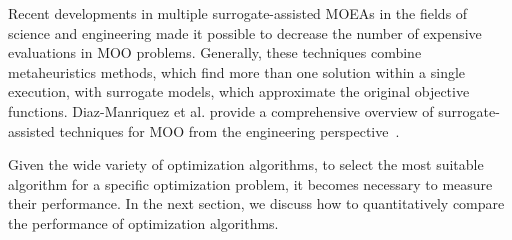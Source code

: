 	
	Recent developments in multiple surrogate-assisted \acp{MOEA} in the fields of science and engineering \cite{Hussein2016,Zapotecas-Martinez2016} made it possible to decrease the number of expensive evaluations in \ac{MOO} problems. Generally, these techniques combine metaheuristics methods, which find more than one solution within a single execution, with surrogate models, which approximate the original objective functions. Diaz-Manriquez et al. provide a comprehensive overview of surrogate-assisted techniques for \ac{MOO} from the engineering perspective~\cite{Diaz-Manriquez2016}. 
	
	Given the wide variety of optimization algorithms, to select the most suitable algorithm for a specific optimization problem, it becomes necessary to measure their performance. In the next section, we discuss how to quantitatively compare the performance of optimization algorithms.
	
	
